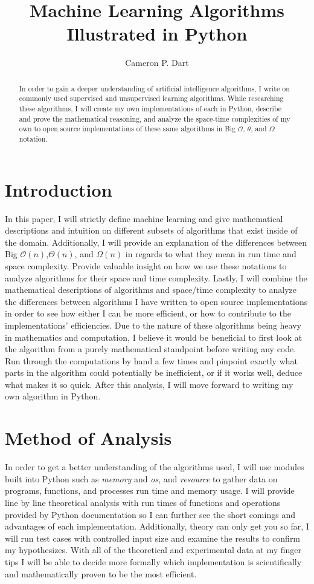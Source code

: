 \documentclass[a4paper]{article}
\title{Machine Learning Algorithms Illustrated in Python}
\author{Cameron P. Dart}
\begin{document}
\maketitle
\begin{abstract}
In order to gain a deeper understanding of artificial intelligence algorithms, I write on commonly used supervised and unsupervised learning algorithms. While researching these algorithms, I will create my own implementations of each in Python, describe and prove the mathematical reasoning, and analyze the space-time complexities of my own to open source implementations of these same algorithms in Big $\mathcal{O}$, $\theta$, and $\Omega$ notation.
\end{abstract}

\section{Introduction}
In this paper, I will strictly define machine learning and give mathematical descriptions and intuition on different subsets of algorithms that exist inside of the domain. Additionally, I will provide an explanation of the differences between Big $\mathcal{O}(n)$,$\Theta(n)$, and $\Omega(n)$ in regards to what they mean in run time and space complexity. Provide valuable insight on how we use these notations to analyze algorithms for their space and time complexity. Lastly, I will combine the mathematical descriptions of algorithms and space/time complexity to analyze the differences between algorithms I have written to open source implementations in order to see how either I can be more efficient, or how to contribute to the implementations' efficiencies. Due to the nature of these algorithms being heavy in mathematics and computation, I believe it would be beneficial to first look at the algorithm from a purely mathematical standpoint before writing any code. Run through the computations by hand a few times and pinpoint exactly what parts in the algorithm could potentially be inefficient, or if it works well, deduce what makes it so quick. After this analysis, I will move forward to writing my own algorithm in Python.   

\section{Method of Analysis}
In order to get a better understanding of the algorithms used, I will use modules built into Python such as \textit{memory} and \textit{os}, and \textit{resource} \cite{WikiPython} to gather data on  programs, functions, and processes run time and memory usage. I will provide line by line theoretical analysis with run times of functions and operations provided by Python documentation so I can further see the short comings and advantages of each implementation. Additionally, theory can only get you so far, I will run test cases with controlled input size and examine the results to confirm my hypothesizes. With all of the theoretical and experimental data at my finger tips I will be able to decide more formally  which implementation is scientifically and mathematically proven to be the most efficient.  
\end{document}
